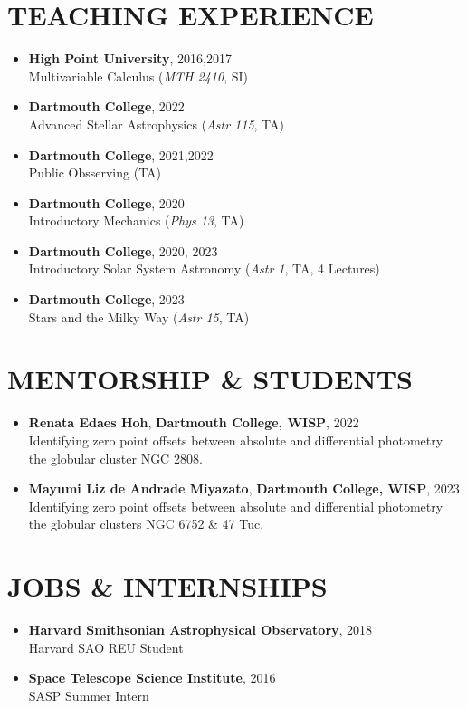 \documentclass[margin, 10pt]{res} %
\begin{document}
\begin{resume}
\section{TEACHING EXPERIENCE}
\begin{itemize}
	\item {\scriptsize \textbf{High Point University}}, {\small 2016,2017} \\ Multivariable Calculus (\textit{MTH 2410}, SI)
	\item {\scriptsize \textbf{Dartmouth College}}, {\small 2022} \\ Advanced Stellar Astrophysics (\textit{Astr 115}, TA)
	\item {\scriptsize \textbf{Dartmouth College}}, {\small 2021,2022} \\ Public Obsserving (TA)
	\item {\scriptsize \textbf{Dartmouth College}}, {\small 2020} \\ Introductory Mechanics (\textit{Phys 13}, TA)
	\item {\scriptsize \textbf{Dartmouth College}}, {\small 2020, 2023} \\ Introductory Solar System Astronomy (\textit{Astr 1}, TA, 4 Lectures)
	\item {\scriptsize \textbf{Dartmouth College}}, {\small 2023} \\ Stars and the Milky Way (\textit{Astr 15}, TA)
\end{itemize}

\section{MENTORSHIP \& STUDENTS}
\begin{itemize}
	\item \textbf{Renata Edaes Hoh}, {\scriptsize \textbf{Dartmouth College, WISP}}, {\small 2022} \\ Identifying zero point offsets between absolute and differential photometry the globular cluster NGC 2808.
	\item \textbf{Mayumi Liz de Andrade Miyazato}, {\scriptsize \textbf{Dartmouth College, WISP}}, {\small 2023} \\ Identifying zero point offsets between absolute and differential photometry the globular clusters NGC 6752 \& 47 Tuc.
\end{itemize}

\section{JOBS \& INTERNSHIPS}
\begin{itemize}
  \item \textbf{{\scriptsize Harvard Smithsonian Astrophysical Observatory}}, {\small 2018} \\Harvard SAO REU Student
  \item \textbf{{\scriptsize Space Telescope Science Institute}}, {\small 2016} \\SASP Summer Intern
\end{itemize}


\end{resume}
\end{document}
